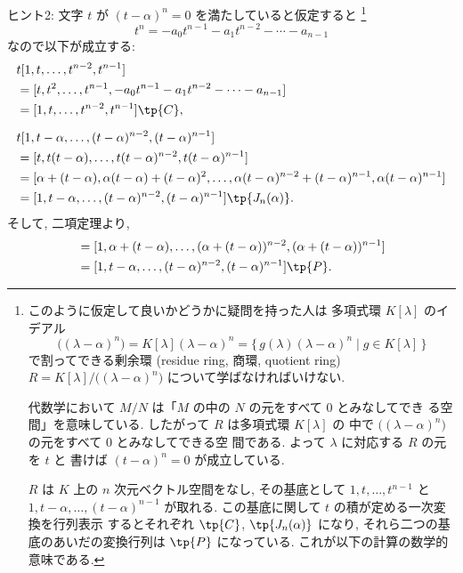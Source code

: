 \documentclass[12pt,twoside]{jarticle}
\begin{document}
\medskip
\noindent
ヒント2: 文字 $t$ が $(t-\alpha)^n=0$ を満たしていると仮定すると%
\footnote{このように仮定して良いかどうかに疑問を持った人は
  多項式環 $K[\lambda]$ のイデアル
  \begin{equation*}
    \bigl((\lambda-\alpha)^n\bigr)
    = K[\lambda](\lambda-\alpha)^n
    = \{\, g(\lambda)(\lambda-\alpha)^n \mid g\in K[\lambda] \,\}
  \end{equation*}
  で割ってできる剰余環 (residue ring, 商環, quotient ring) %
  $R=K[\lambda]/\bigl((\lambda-\alpha)^n\bigr)$ について学ばなければいけない.

  代数学において $M/N$ は「$M$ の中の $N$ の元をすべて $0$ とみなしてでき
  る空間」を意味している.  したがって $R$ は多項式環 $K[\lambda]$ の
  中で $\bigl((\lambda-\alpha)^n\bigr)$ の元をすべて $0$ とみなしてできる空
  間である. よって $\lambda$ に対応する $R$ の元を $t$ と
  書けば $(t-\alpha)^n=0$ が成立している.

  $R$ は $K$ 上の $n$ 次元ベクトル空間をなし, 
  その基底として $1,t,\dots,t^{n-1}$ と $1,t-\alpha,\dots,(t-\alpha)^{n-1}$ 
  が取れる.  この基底に関して $t$ の積が定める一次変換を行列表示
  するとそれぞれ $\tp{C}$, $\tp{J_n(\alpha)}$ になり, 
  それら二つの基底のあいだの変換行列は $\tp{P}$ になっている.
  これが以下の計算の数学的意味である.}
\begin{equation*}
  t^n=-a_0t^{n-1}-a_1t^{n-2}-\cdots-a_{n-1}
\end{equation*}
なので以下が成立する:
\begin{align*}
  &
  t [1,t,\dots,t^{n-2},t^{n-1}]
  \\ &
  = [t,t^2,\dots,t^{n-1},-a_0t^{n-1}-a_1t^{n-2}-\cdots-a_{n-1}]
  \\ &
  = [1,t,\dots,t^{n-2},t^{n-1}] \tp{C},
  \\[\medskipamount] &
  t [1,t-\alpha,\dots,(t-\alpha)^{n-2},(t-\alpha)^{n-1}]
  \\ &
  = [t,t(t-\alpha),\dots,t(t-\alpha)^{n-2},t(t-\alpha)^{n-1}]
  \\ &
  = [\alpha+(t-\alpha), \alpha(t-\alpha)+(t-\alpha)^2,\dots,
     \alpha(t-\alpha)^{n-2}+(t-\alpha)^{n-1},\alpha(t-\alpha)^{n-1}]
  \\ &
  = [1,t-\alpha,\dots,(t-\alpha)^{n-2},(t-\alpha)^{n-1}] \tp{J_n(\alpha)}.
\end{align*}
そして, 二項定理より,
\begin{align*}
  [1,t,\dots,t^{n-2},t^{n-1}]
  &
  = [1,\alpha+(t-\alpha),\dots,(\alpha+(t-\alpha))^{n-2},
     (\alpha+(t-\alpha))^{n-1}]
  \\ &
  = [1,t-\alpha,\dots,(t-\alpha)^{n-2},(t-\alpha)^{n-1}] \tp{P}.
\end{align*}
\end{document}

